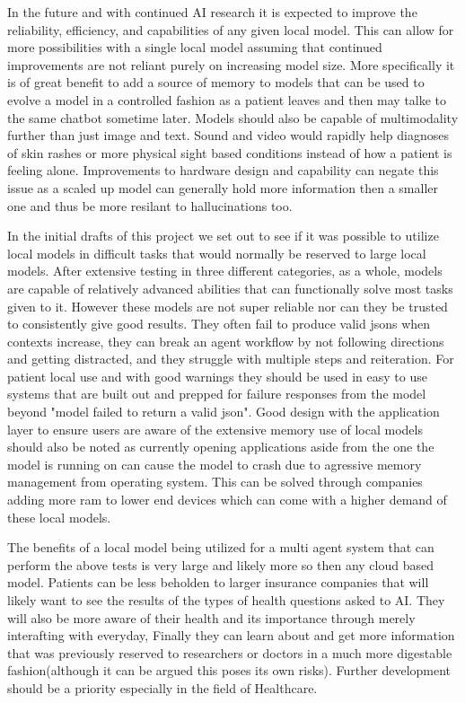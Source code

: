 \documentclass[sigconf]{acmart}
\begin{document}
In the future and with continued AI research it is expected to improve the reliability, efficiency, and capabilities of any given local model. This can allow for more possibilities with a single local model assuming that continued improvements are not reliant purely on increasing model size. More specifically it is of great benefit to add a source of memory to models that can be used to evolve a model in a controlled fashion as a patient leaves and then may talke to the same chatbot sometime later. Models should also be capable of multimodality further than just image and text. Sound and video would rapidly help diagnoses of skin rashes or more physical sight based conditions instead of how a patient is feeling alone. Improvements to hardware design and capability can negate this issue as a scaled up model can generally hold more information then a smaller one and thus be more resilant to hallucinations too. 

In the initial drafts of this project we set out to see if it was possible to utilize local models in difficult tasks that would normally be reserved to large local models. After extensive testing in three different categories, as a whole, models are capable of relatively advanced abilities that can functionally solve most tasks given to it. However these models are not super reliable nor can they be trusted to consistently give good results. They often fail to produce valid jsons when contexts increase, they can break an agent workflow by not following directions and getting distracted, and they struggle with multiple steps and reiteration. For patient local use and with good warnings they should be used in easy to use systems that are built out and prepped for failure responses from the model beyond "model failed to return a valid json". Good design with the application layer to ensure users are aware of the extensive memory use of local models should also be noted as currently opening applications aside from the one the model is running on can cause the model to crash due to agressive memory management from operating system. This can be solved through companies adding more ram to lower end devices which can come with a higher demand of these local models.

The benefits of a local model being utilized for a multi agent system that can perform the above tests is very large and likely more so then any cloud based model. Patients can be less beholden to larger insurance companies that will likely want to see the results of the types of health questions asked to AI. They will also be more aware of their health and its importance through merely interafting with everyday, Finally they can learn about and get more information that was previously reserved to researchers or doctors in a much more digestable fashion(although it can be argued this poses its own risks). Further development should be a priority especially in the field of Healthcare.




\end{document}
